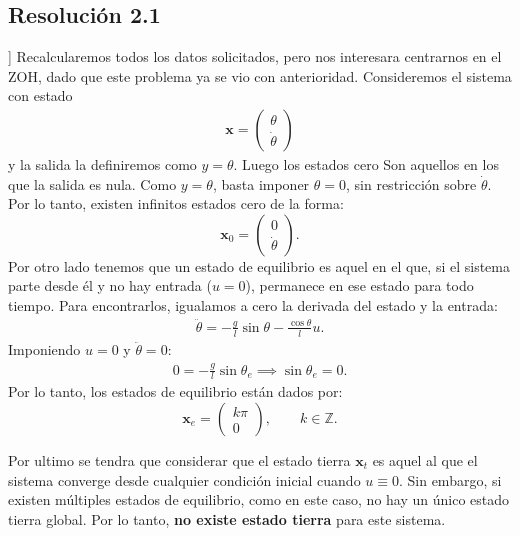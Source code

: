 \documentclass[
  11pt,
  letterpaper,
   addpoints,
  answers
  ]{exam}
\begin{document}
\begin{questions}
\begin{solution}
\subsection*{Resolución 2.1}]
Recalcularemos todos los datos solicitados, pero nos interesara centrarnos en el ZOH, dado que este problema ya se vio con anterioridad. Consideremos el sistema con estado 
\begin{align}
\mathbf{x} = \begin{pmatrix} \theta \\ \dot{\theta} \end{pmatrix}
\end{align}
y la salida la definiremos como $y = \theta$. Luego los estados cero Son aquellos en los que la salida es nula. Como $y = \theta$, basta imponer $\theta = 0$, sin restricción sobre $\dot{\theta}$. Por lo tanto, existen infinitos estados cero de la forma:
\begin{equation}
\mathbf{x}_0 = \begin{pmatrix} 0 \\ \dot{\theta} \end{pmatrix}.
\end{equation}
Por otro lado tenemos que un estado de equilibrio es aquel en el que, si el sistema parte desde él y no hay entrada ($u = 0$), permanece en ese estado para todo tiempo. Para encontrarlos, igualamos a cero la derivada del estado y la entrada:
\begin{align}
\ddot{\theta} = -\frac{g}{l} \sin \theta - \frac{\cos \theta}{l} u.
\end{align}
Imponiendo $u = 0$ y $\ddot{\theta} = 0$:
\begin{align}
0 = -\frac{g}{l} \sin \theta_e \implies \sin \theta_e = 0.
\end{align}
Por lo tanto, los estados de equilibrio están dados por:
\begin{equation}
\mathbf{x}_e = \begin{pmatrix} k\pi \\ 0 \end{pmatrix}, \qquad k \in \mathbb{Z}.
\end{equation}

Por ultimo se tendra que considerar que el estado tierra $\mathbf{x}_t$ es aquel al que el sistema converge desde cualquier condición inicial cuando $u \equiv 0$. Sin embargo, si existen múltiples estados de equilibrio, como en este caso, no hay un único estado tierra global. Por lo tanto, \textbf{no existe estado tierra} para este sistema.


\end{solution}
\end{questions}
\end{document}

